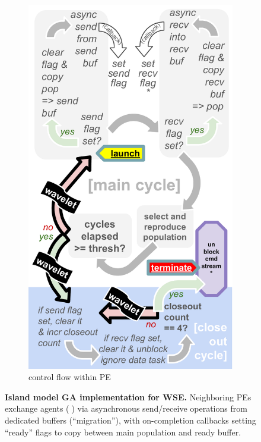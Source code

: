 \begin{figure}[t!]
\begin{subfigure}{0.5\linewidth}
    \includegraphics[width=0.8\linewidth]{img/controlflow-schematic}%
    \vspace{-0.05in}
    \caption{control flow within PE}
  \end{subfigure}
  \vspace{-0.25in}
  \caption{%
  \textbf{Island model GA implementation for WSE.}
  \footnotesize
  Neighboring PEs exchange agents (🦠) via asynchronous send/receive operations from dedicated buffers (``migration''), with on-completion callbacks setting ``ready'' flags to copy between main population and ready buffer.
  }
  \label{fig:async-ga-schematic}
  \vspace{-0.2in}
\end{figure}
